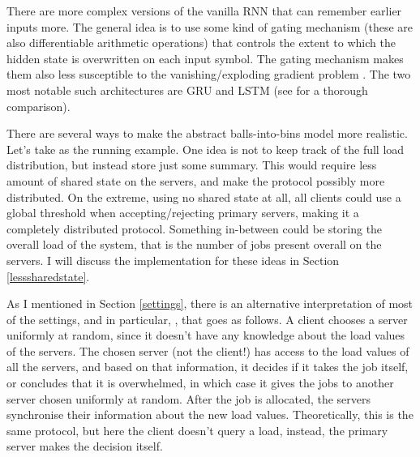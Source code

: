 There are more complex versions of the vanilla RNN that can remember earlier inputs more. The general idea is to use some kind of gating mechanism (these are also differentiable arithmetic operations) that controls the extent to which the hidden state is overwritten on each input symbol. The gating mechanism makes them also less susceptible to the vanishing/exploding gradient problem \cite{noh2021rnnvanishinggradient}. The two most notable such architectures are GRU and LSTM (see \cite{shewalkar2019rnngrulstm} for a thorough comparison).


\iffalse
There are several ways to make the abstract balls-into-bins model more realistic. Let's take \TwoThinning as the running example. One idea is not to keep track of the full load distribution, but instead store just some summary. This would require less amount of shared state on the servers, and make the protocol possibly more distributed. On the extreme, using no shared state at all, all clients could use a global threshold when accepting/rejecting primary servers, making it a completely distributed protocol. Something in-between could be storing the overall load of the system, that is the number of jobs present overall on the servers. I will discuss the implementation for these ideas in Section \ref{lesssharedstate}.


As I mentioned in Section \ref{settings}, there is an alternative interpretation of most of the settings, and in particular, \TwoThinning, that goes as follows. A client chooses a server uniformly at random, since it doesn't have any knowledge about the load values of the servers. The chosen server (not the client!) has access to the load values of all the servers, and based on that information, it decides if it takes the job itself, or concludes that it is overwhelmed, in which case it gives the jobs to another server chosen uniformly at random. After the job is allocated, the servers synchronise their information about the new load values. Theoretically, this is the same \TwoThinning protocol, but here the client doesn't query a load, instead, the primary server makes the decision itself.


